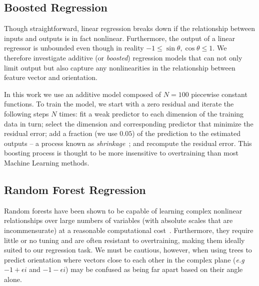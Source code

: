 \documentclass{bmvc2k}
\def\eg{\emph{e.g}\bmvaOneDot}
\begin{document}
\subsection{Boosted Regression}
\label{s:learning_boosted}
Though straightforward, linear regression breaks down if the relationship between inputs and outputs is in fact nonlinear. Furthermore, the output of a linear regressor is unbounded even though in reality $-1 \leq \sin\theta,\cos\theta \leq 1$. We therefore investigate additive (or \emph{boosted}) regression models that can not only limit output but also capture any nonlinearities in the relationship between feature vector and orientation.

In this work we use an additive model composed of $N=100$ piecewise constant functions. To train the model, we start with a zero residual and iterate the following steps $N$ times: fit a weak predictor to each dimension of the training data in turn; select the dimension and corresponding predictor that minimize the residual error; add a fraction (we use $0.05$) of the prediction to the estimated outputs -- a process known as \emph{shrinkage}~\cite{Friedman_AoS01}; and recompute the residual error. This boosting process is thought to be more insensitive to overtraining than most Machine Learning methods.


\subsection{Random Forest Regression}
\label{s:learning_forest}
Random forests have been shown to be capable of learning complex nonlinear relationships over large numbers of variables (with absolute scales that are incommensurate) at a reasonable computational cost~\cite{Breiman_ML01}. Furthermore, they require little or no tuning and are often resistant to overtraining, making them ideally suited to our regression task. We must be cautious, however, when using trees to predict orientation where vectors close to each other in the complex plane (\eg~$-1+\epsilon i$ and $-1-\epsilon i$) may be confused as being far apart based on their angle alone.
\end{document}
